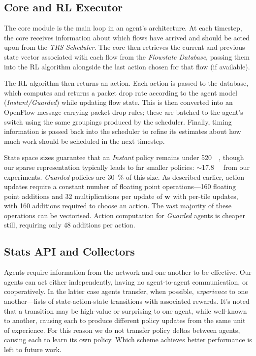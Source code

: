 \documentclass[10pt, times, conference, letterpaper]{IEEEtran}
\newcommand{\wvec}[1]{\ensuremath{\bm{w}_{#1}}}
\begin{document}
\subsection{Core and RL Executor}\label{sec:core-and-rl-executor}
The core module is the main loop in an agent's architecture.
At each timestep, the core receives information about which flows have arrived and should be acted upon from the \emph{TRS Scheduler}.
The core then retrieves the current and previous state vector associated with each flow from the \emph{Flowstate Database}, passing them into the RL algorithm alongside the last action chosen for that flow (if available).

The RL algorithm then returns an action.
Each action is passed to the database, which computes and returns a packet drop rate according to the agent model (\emph{Instant/Guarded}) while updating flow state.
This is then converted into an OpenFlow message carrying packet drop rules; these are batched to the agent's switch using the same groupings produced by the scheduler.
Finally, timing information is passed back into the scheduler to refine its estimates about how much work should be scheduled in the next timestep.

State space sizes guarantee that an \emph{Instant} policy remains under \SI{520}{\kibi\byte}, though our sparse representation typically leads to far smaller policies: $\sim$\SI{17.8}{\kibi\byte} from our experiments.
\emph{Guarded} policies are \SI{30}{\percent} of this size.
As described earlier, action updates require a constant number of floating point operations---\num{160} floating point additions and \num{32} multiplications per update of $\wvec{}$ with per-tile updates, with \num{160} additions required to choose an action.
The vast majority of these operations can be vectorised.
Action computation for \emph{Guarded} agents is cheaper still, requiring only \num{48} additions per action.

\subsection{Stats API and Collectors}
Agents require information from the network and one another to be effective.
Our agents can act either independently, having no agent-to-agent communication, or cooperatively.
In the latter case agents transfer, when possible, \emph{experience} to one another---lists of state-action-state transitions with associated rewards.
It's noted that a transition may be high-value or surprising to one agent, while well-known to another, causing each to produce different policy updates from the same unit of experience.
For this reason we do not transfer policy deltas between agents, causing each to learn its own policy.
Which scheme achieves better performance is left to future work.
\end{document}
